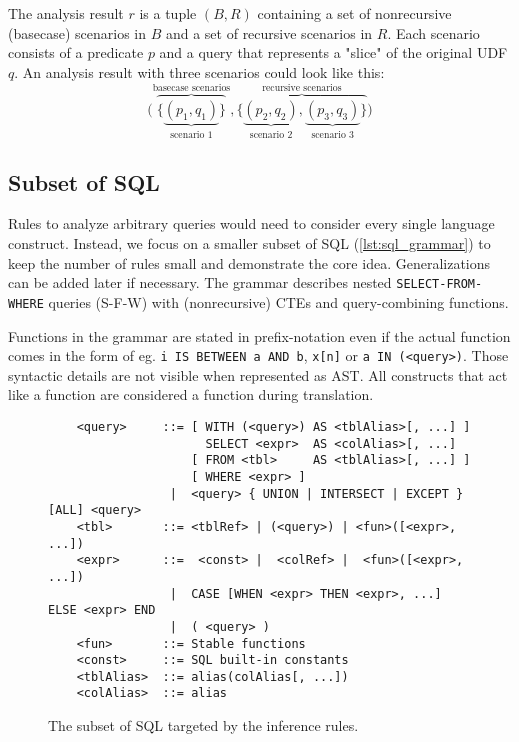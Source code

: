 The analysis result $r$ is a tuple $(B, R)$ containing a set of nonrecursive (basecase) scenarios in $B$ and a set of recursive scenarios in $R$. Each scenario consists of a predicate $p$ and a query that represents a "slice" of the original UDF $q$. An analysis result with three scenarios could look like this:
$$
\Big(
    \overbrace{\big\{
        \underbrace{
            (p_1, q_1)
        }_{\text{scenario 1}}
    \big\}}^{\text{basecase scenarios}}
    ,
    \overbrace{\big\{
        \underbrace{
            (p_2, q_2)
        }_{\text{scenario 2}},
        \underbrace{
            (p_3, q_3)
        }_{\text{scenario 3}}
    \big\}}^{\text{recursive scenarios}}
\Big)
$$

\subsection{Subset of SQL}
Rules to analyze arbitrary queries would need to consider every single language construct. Instead, we focus on a smaller subset of SQL (\autoref{lst:sql_grammar}) to keep the number of rules small and demonstrate the core idea. Generalizations can be added later if necessary. The grammar describes nested \texttt{SELECT-FROM-WHERE} queries (S-F-W) with (nonrecursive) CTEs and query-combining functions.

Functions in the grammar are stated in prefix-notation even if the actual function comes in the form of eg. \texttt{i IS BETWEEN a AND b}, \texttt{x[n]} or \texttt{a IN (<query>)}. Those syntactic details are not visible when represented as AST. All constructs that act like a function are considered a function during translation.

\begin{figure}[h!]
    \begin{verbatim}
    <query>     ::= [ WITH (<query>) AS <tblAlias>[, ...] ]
                      SELECT <expr>  AS <colAlias>[, ...]
                    [ FROM <tbl>     AS <tblAlias>[, ...] ]
                    [ WHERE <expr> ]
                 |  <query> { UNION | INTERSECT | EXCEPT } [ALL] <query>
    <tbl>       ::= <tblRef> | (<query>) | <fun>([<expr>, ...])
    <expr>      ::=  <const> |  <colRef> |  <fun>([<expr>, ...])
                 |  CASE [WHEN <expr> THEN <expr>, ...] ELSE <expr> END
                 |  ( <query> )
    <fun>       ::= Stable functions
    <const>     ::= SQL built-in constants
    <tblAlias>  ::= alias(colAlias[, ...])
    <colAlias>  ::= alias
    \end{verbatim}
    \caption{The subset of SQL targeted by the inference rules.}
    \label{lst:sql_grammar}
\end{figure}


